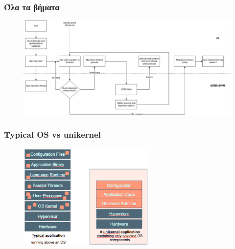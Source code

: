 \documentclass[red,slidestop,notes,compress,mathserif]{beamer}
\begin{document}
\begin{frame}
\frametitle{Όλα τα βήματα}
\begin{figure}
\center
\includegraphics[scale=0.3]{figures/fork_olo1.png}
\end{figure}
\end{frame}

\begin{frame}
\frametitle{Typical OS vs unikernel}
\begin{figure}
\center
\includegraphics{figures/unikernel_vs_os.png}
\end{figure}
\end{frame}
\end{document}
